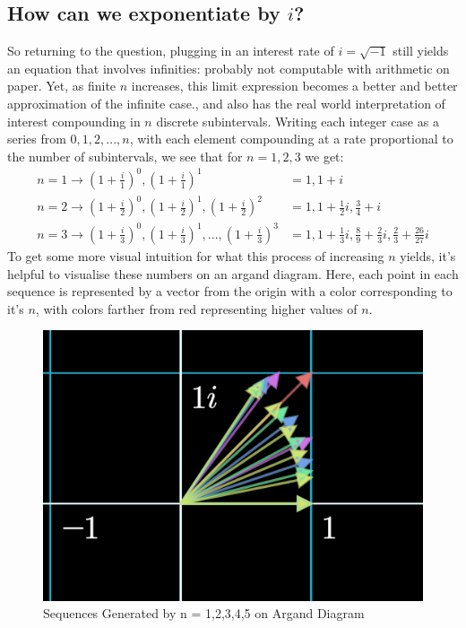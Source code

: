 \documentclass[11pt,a4paper]{article}
\begin{document}
\subsection{How can we exponentiate by $i$?}
So returning to the question, plugging in an interest rate of $i = \sqrt{-1}$ still yields an equation that involves infinities: probably not computable with arithmetic on paper. Yet, as finite $n$ increases, this limit expression becomes a better and better approximation of the infinite case., and also has the real world interpretation of interest compounding in $n$ discrete subintervals.  Writing each integer case as a series from $0, 1,2, ..., n$, with each element compounding at a rate proportional to the number of subintervals, we see that for $n = 1, 2,3$ we get:
\begin{align*}
n = 1 \rightarrow  \left( 1+ \frac{i}{1} \right) ^0, \left( 1+ \frac{i}{1} \right) ^1 &= 1, 1+i  \\
n = 2 \rightarrow  \left( 1+ \frac{i}{2} \right) ^0, \left( 1+ \frac{i}{2} \right) ^1, \left( 1+ \frac{i}{2} \right) ^2 &= 1, 1+ \frac{1}{2}i, \frac{3}{4}+i \\
n = 3 \rightarrow  \left( 1+ \frac{i}{3} \right) ^0, \left( 1+ \frac{i}{3} \right) ^1,  ...  ,  \left( 1+ \frac{i}{3} \right) ^3 &= 1, 1+ \frac{1}{3}i,\frac{8}{9}+\frac{2}{3}i, \frac{2}{3}+\frac{26}{27}i
\end{align*}
To get some more visual intuition for what this process of increasing $n$ yields, it's helpful to visualise these numbers on an argand diagram. Here,  each point in each sequence is represented by a vector from the origin with a color corresponding to it's $n$, with colors farther from red representing higher values of $n$.

\begin{figure}[h]
\begin{center}
\includegraphics[scale=.4]{onefive} 
\caption{Sequences Generated by n = 1,2,3,4,5 on Argand Diagram}
\end{center}
\end{figure}
\end{document}
